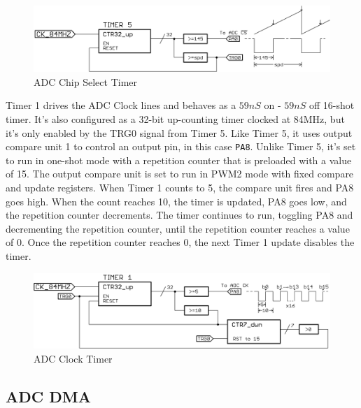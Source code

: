 \documentclass[11pt,twoside]{mitthesis}
\begin{document}
\begin{figure}[H]
  \begin{center}
      \includegraphics[width=1\textwidth]{../tim5.png}
      \caption{ADC Chip Select Timer}
  \end{center}
\end{figure}

Timer 1 drives the ADC Clock lines and behaves as a $59nS$ on - $59nS$ off 16-shot timer.
It's also configured as a 32-bit up-counting timer clocked at 84MHz, but it's only enabled by the TRG0 signal from Timer 5.
Like Timer 5, it uses output compare unit 1 to control an output pin, in this case \texttt{PA8}.
Unlike Timer 5, it's set to run in one-shot mode with a repetition counter that is preloaded with a value of 15.
The output compare unit is set to run in PWM2 mode with fixed compare and update registers.
When Timer 1 counts to 5, the compare unit fires and PA8 goes high.
When the count reaches 10, the timer is updated, PA8 goes low, and the repetition counter decrements.
The timer continues to run, toggling PA8 and decrementing the repetition counter, until the repetition counter reaches a value of 0.
Once the repetition counter reaches 0, the next Timer 1 update disables the timer.



\begin{figure}[h!]
  \begin{center}
      \includegraphics[width=1\textwidth]{../tim1.png}
      \caption{ADC Clock Timer}
  \end{center}
\end{figure}


\subsection{ADC DMA}
\end{document}
